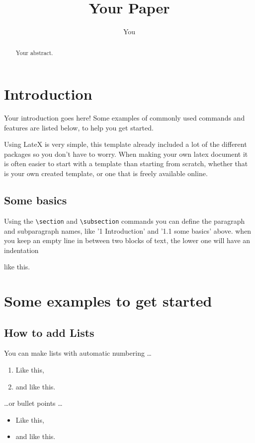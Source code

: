 \documentclass[12pt,a4paper]{article}
\title{Your Paper}
\author{You}
\begin{document}
\maketitle

\begin{abstract}
Your abstract.
\end{abstract}

\section{Introduction}

Your introduction goes here! Some examples of commonly used commands and features are listed below, to help you get started.

Using LateX is very simple, this template already included a lot of the different packages so you don't have to worry. When making your own latex document it is often easier to start with a template than starting from scratch, whether that is your own created template, or one that is freely available online.

\subsection{Some basics}

Using the \verb=\section= and \verb=\subsection= commands you can define the paragraph and subparagraph names, like '1 Introduction' and '1.1 some basics' above. when you keep an empty line in between two blocks of text, the lower one will have an indentation

like this.

\section{Some examples to get started}

\subsection{How to add Lists}

You can make lists with automatic numbering \dots

\begin{enumerate}
\item Like this,
\item and like this.
\end{enumerate}
\dots or bullet points \dots
\begin{itemize}
\item Like this,
\item and like this.
\end{itemize}
\end{document}
